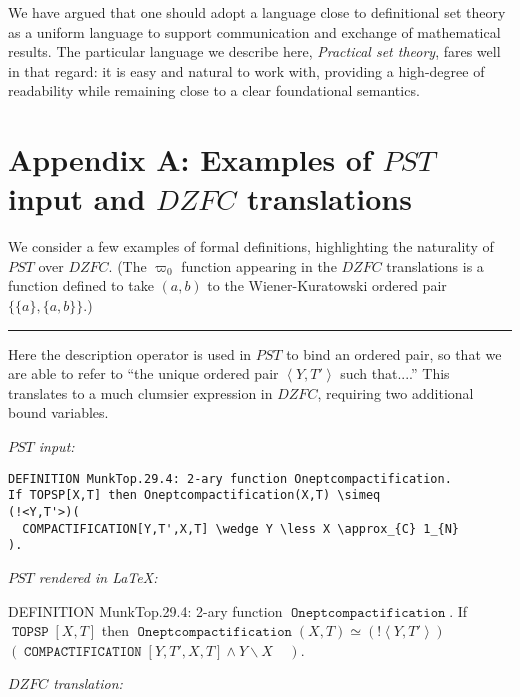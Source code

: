 \documentclass{llncs}
\newcommand{\myrule}{\noindent \rule{\textwidth}{0.3mm}}
\newcommand{\na}[1]{\mathit{#1}}    \newcommand{\fn}[1]{\mathit{#1}}    \newcommand{\ax}[1]{\mathit{(#1)}}  \newcommand{\mdl}[1]{\mathcal{#1}}
\newcommand{\seq}[1]{\left\langle #1 \right\rangle}
\newcommand{\less}{\backslash}
\begin{document}
We have argued that one should adopt a language close to definitional
set theory as a uniform language to support communication and exchange
of mathematical results. The particular language we describe here,
\emph{Practical set theory}, fares well in that regard: it
is easy and natural to work with, providing a high-degree of
readability while remaining close to a clear foundational semantics.


\section*{Appendix A: Examples of $\na{PST}$ input and $\na{DZFC}$
  translations} 
\label{PST_DZFC_appendix}

We consider a few examples of formal definitions, highlighting the
naturality of $\na{PST}$ over $\na{DZFC}$. (The $\varpi_0$ function
appearing in the $\na{DZFC}$ translations is a function defined to
take $(a,b)$ to the Wiener-Kuratowski ordered pair $\{ \{a\}, \{ a,b
\} \}$.)

\smallskip
\myrule

\medskip

 Here the description operator is used in
$\na{PST}$ to bind an ordered pair, so that we are able to refer to
``the unique ordered pair $\left<Y,T'\right>$ such that....'' This
translates to a much clumsier expression in $\na{DZFC}$, requiring two
additional bound variables.

\medskip
\noindent \emph{$\na{PST}$ input:}

\vspace{-2mm}

\begin{verbatim}
DEFINITION MunkTop.29.4: 2-ary function Oneptcompactification.
If TOPSP[X,T] then Oneptcompactification(X,T) \simeq
(!<Y,T'>)(
  COMPACTIFICATION[Y,T',X,T] \wedge Y \less X \approx_{C} 1_{N}
).
\end{verbatim}

\noindent \emph{$\na{PST}$ rendered in \LaTeX{}:}

\medskip
\noindent DEFINITION MunkTop.29.4: 2-ary function
$\mathop{\mathtt{Oneptcompactification}}$. If \hfil\break $\mathop{\mathtt{TOPSP}}[X,T]$
then $\mathop{\mathtt{Oneptcompactification}}(X,T) \simeq (!
\seq{Y,T'})$ \hfil\break $(\mathop{\mathtt{COMPACTIFICATION}}[Y,T',X,T] \wedge Y \less X
\mathop{\mathtt{\approx_{C}}} \mathop{\mathtt{1_{N}}})$.

\bigskip
\noindent \emph{$\na{DZFC}$ translation:}
\end{document}
